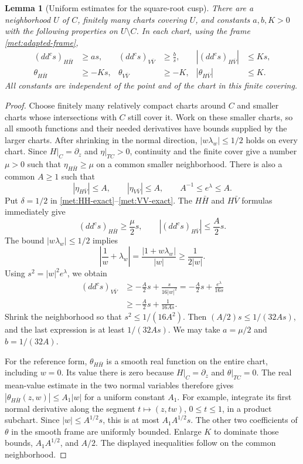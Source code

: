\documentclass[11pt,a4paper]{article}
\numberwithin{equation}{section}
\newtheorem{lemma}[theorem]{Lemma}
\theoremstyle{definition}
\theoremstyle{remark}
\newcommand{\ddc}{dd^{c}}
\begin{document}
\begin{lemma}[Uniform estimates for the square-root cusp]
\label{met:cusp-estimates}
There are a neighborhood $U$ of $C$, finitely many charts covering
$U$, and constants $a,b,K>0$ with the following properties on
$U\setminus C$. In each chart, using the frame
\eqref{met:adapted-frame},
\begin{align}
 (\ddc s)_{H\bar H}&\ge a s,&
 (\ddc s)_{V\bar V}&\ge \frac b{s},&
 |(\ddc s)_{H\bar V}|&\le K s,\label{met:cusp-bounds}\\
 \theta_{H\bar H}&\ge-Ks,&
 \theta_{V\bar V}&\ge-K,&
 |\theta_{H\bar V}|&\le K.\label{met:theta-bounds}
\end{align}
All constants are independent of the point and of the chart in this
finite covering.
\end{lemma}

\begin{proof}
Choose finitely many relatively compact charts around $C$ and smaller
charts whose intersections with $C$ still cover it. Work on these
smaller charts, so all smooth functions and their needed derivatives
have bounds supplied by the larger charts. After shrinking in the
normal direction, $|w\lambda_w|\le1/2$ holds on every chart. Since
$H|_C=\partial_z$ and $\eta|_{TC}>0$, continuity and the finite cover
give a number $\mu>0$ such that
$\eta_{H\bar H}\ge\mu$ on a common smaller neighborhood. There is
also a common $A\ge1$ such that
\[
 |\eta_{H\bar V}|\le A,\qquad |\eta_{V\bar V}|\le A,
 \qquad A^{-1}\le e^\lambda\le A.
\]
Put $\delta=1/2$ in \eqref{met:HH-exact}--\eqref{met:VV-exact}.
The $H\bar H$ and $H\bar V$ formulas immediately give
\[
 (\ddc s)_{H\bar H}\ge\frac\mu2 s,
 \qquad |(\ddc s)_{H\bar V}|\le\frac A2s.
\]
The bound $|w\lambda_w|\le1/2$ implies
\[
 \left|\frac1w+\lambda_w\right|
   =\frac{|1+w\lambda_w|}{|w|}\ge\frac{1}{2|w|}.
\]
Using $s^2=|w|^2e^\lambda$, we obtain
\begin{align*}
 (\ddc s)_{V\bar V}
 &\ge-\frac A2s+\frac{s}{16|w|^2}
  =-\frac A2s+\frac{e^\lambda}{16s}\\
 &\ge-\frac A2s+\frac{1}{16A s}.
\end{align*}
Shrink the neighborhood so that $s^2\le1/(16A^2)$.
Then $(A/2)s\le1/(32A s)$, and the last expression is at least
$1/(32A s)$. We may take $a=\mu/2$ and $b=1/(32A)$.

For the reference form, $\theta_{H\bar H}$ is a smooth real function
on the entire chart, including $w=0$. Its value there is zero because
$H|_C=\partial_z$ and $\theta|_{TC}=0$. The real mean-value estimate
in the two normal variables therefore gives
$|\theta_{H\bar H}(z,w)|\le A_1|w|$ for a uniform constant $A_1$.
For example, integrate its first normal derivative along the segment
$t\mapsto(z,tw)$, $0\le t\le1$, in a product subchart. Since
$|w|\le A^{1/2}s$, this is at most $A_1A^{1/2}s$. The other two
coefficients of $\theta$ in the smooth frame are uniformly bounded.
Enlarge $K$ to dominate those bounds, $A_1A^{1/2}$, and $A/2$.
The displayed inequalities follow on the common neighborhood.
\end{proof}
\end{document}
